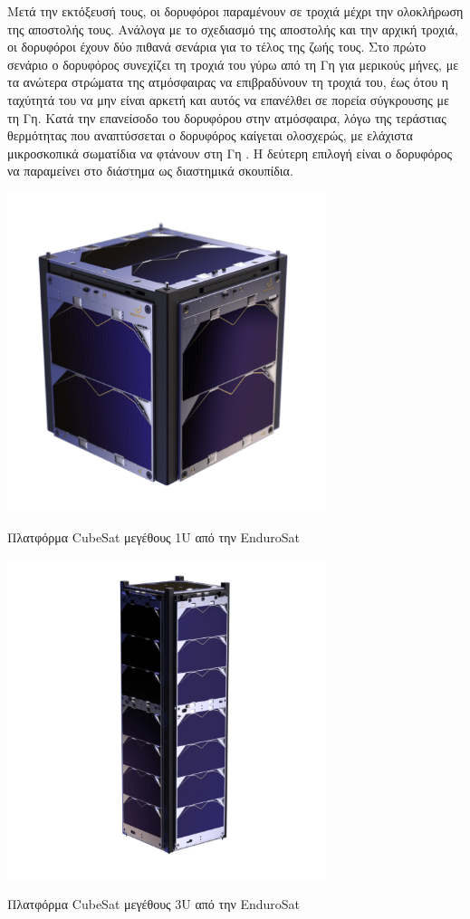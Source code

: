 \documentclass[a4paper,nobib,justified]{tufte-book}
\begin{document}
Μετά την εκτόξευσή τους, οι δορυφόροι παραμένουν σε τροχιά μέχρι την ολοκλήρωση της αποστολής τους. Ανάλογα με το σχεδιασμό της αποστολής και την αρχική τροχιά, οι δορυφόροι έχουν δύο πιθανά σενάρια για το τέλος της ζωής τους. Στο πρώτο σενάριο ο δορυφόρος συνεχίζει τη τροχιά του γύρω από τη Γη για μερικούς μήνες, με τα ανώτερα στρώματα της ατμόσφαιρας να επιβραδύνουν τη τροχιά του, έως ότου η ταχύτητά του να μην είναι αρκετή και αυτός να επανέλθει σε πορεία σύγκρουσης με τη Γη. Κατά την επανείσοδο του δορυφόρου στην ατμόσφαιρα, λόγω της τεράστιας θερμότητας που αναπτύσσεται ο δορυφόρος καίγεται ολοσχερώς, με ελάχιστα μικροσκοπικά σωματίδια να φτάνουν στη Γη . Η δεύτερη επιλογή είναι ο δορυφόρος να παραμείνει στο διάστημα ως διαστημικά σκουπίδια.

\begin{marginfigure}
	\includegraphics[width=0.7\textwidth]{media/images/endurosat-platforms/1u.png}
	\caption{Πλατφόρμα CubeSat μεγέθους 1U από την EnduroSat }

	\includegraphics[width=0.7\textwidth]{media/images/endurosat-platforms/3u.png}
	\caption{Πλατφόρμα CubeSat μεγέθους 3U από την EnduroSat }
\end{marginfigure}
\end{document}
